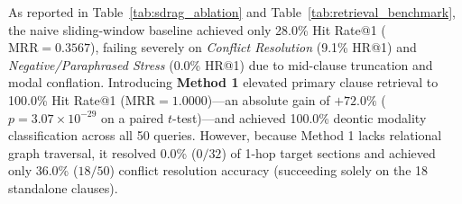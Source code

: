 \documentclass[conference]{IEEEtran}
\begin{document}
\begin{table}[t]
\caption{Category-Level Retrieval \& Conflict Resolution Breakdown ($N=50$)}
\label{tab:retrieval_benchmark}
\centering
{}
\end{table}

As reported in Table~\ref{tab:sdrag_ablation} and Table~\ref{tab:retrieval_benchmark}, the naive sliding-window baseline achieved only 28.0\% Hit Rate@1 ($\text{MRR} = 0.3567$), failing severely on \textit{Conflict Resolution} (9.1\% HR@1) and \textit{Negative/Paraphrased Stress} (0.0\% HR@1) due to mid-clause truncation and modal conflation. Introducing \textbf{Method 1} elevated primary clause retrieval to 100.0\% Hit Rate@1 ($\text{MRR} = 1.0000$)---an absolute gain of $+72.0\%$ ($p = 3.07 \times 10^{-29}$ on a paired $t$-test)---and achieved 100.0\% deontic modality classification across all 50 queries. However, because Method 1 lacks relational graph traversal, it resolved 0.0\% ($0/32$) of 1-hop target sections and achieved only 36.0\% ($18/50$) conflict resolution accuracy (succeeding solely on the 18 standalone clauses).
\end{document}
